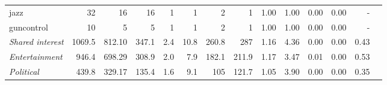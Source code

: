 \begin{tabular}{l|rrrrr|rrrrrrrr}
                jazz &     32 &     16 &                         16 &   1 &      1 &      2 &      1 & 1.00 &   1.00 &   0.00 &         0.00 &                                 - \\
          guncontrol &     10 &      5 &                          5 &   1 &      1 &      2 &      1 & 1.00 &   1.00 &   0.00 &         0.00 &                                 - \\
    \midrule
    \textit{Shared interest} & 1069.5 & 812.10 & 347.1 & 2.4 & 10.8 & 260.8 & 287 & 1.16 & 4.36 & 0.00 & 0.00 & 0.43 \\
      \textit{Entertainment} &  946.4 & 698.29 & 308.9 & 2.0 &  7.9 & 182.1 & 211.9 & 1.17 & 3.47 & 0.01 & 0.00 & 0.53 \\
          \textit{Political} &  439.8 & 329.17 & 135.4 & 1.6 &  9.1 & 105 & 121.7 & 1.05 & 3.90 & 0.00 & 0.00 & 0.35 \\
    \bottomrule
\end{tabular}
    
